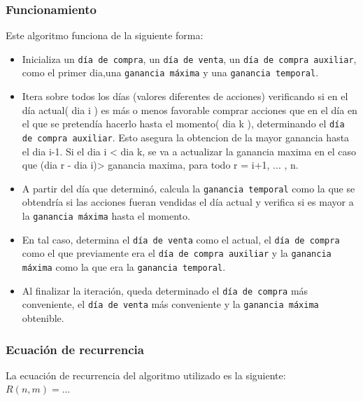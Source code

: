 \documentclass[a4paper, 10pt]{article}
\def\code#1{\texttt{#1}}
\newcommand\tab[1][0.5cm]{\hspace*{#1}}
\begin{document}
            \subsubsection{Funcionamiento}
                \tab Este algoritmo funciona de la siguiente forma:
                \begin{itemize}
                    \item Inicializa un \code{día de compra}, un \code{día de venta}, un \code{día de compra auxiliar}, como el
                    primer dia,una \code{ganancia máxima} y una \code{ganancia temporal}.
                    \item Itera sobre todos los días (valores diferentes de acciones) verificando si
                    en el día actual( dia i ) es más o menos favorable comprar acciones que en el día en el
                    que se pretendía hacerlo hasta el momento( dia k ), determinando el \code{día de compra auxiliar}.
                    Esto asegura la obtencion de la mayor ganancia hasta el dia i-1. Si el dia i < dia k, se va a actualizar
                    la ganancia maxima en el caso que (dia r - dia i)> ganancia maxima, para todo r = i+1, ... , n.
                    \item A partir del día que determinó, calcula la \code{ganancia temporal} como la que se obtendría
                    si las acciones fueran vendidas el día actual y verifica si es mayor a la \code{ganancia máxima}
                    hasta el momento.
                    \item En tal caso, determina el \code{día de venta} como el actual, el \code{día de compra}
                    como el que previamente era el \code{día de compra auxiliar} y la \code{ganancia máxima} como
                    la que era la \code{ganancia temporal}.
                    \item Al finalizar la iteración, queda determinado el \code{día de compra} más conveniente, el
                    \code{día de venta} más conveniente y la \code{ganancia máxima} obtenible.
                \end{itemize}
            \subsubsection{Ecuación de recurrencia}
                \tab La ecuación de recurrencia del algoritmo utilizado es la siguiente: \\
                \tab\tab\tab $ R(n, m) = ... $ %
    \newpage
\end{document}
